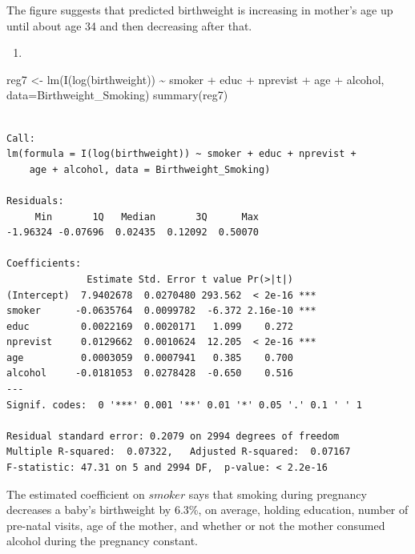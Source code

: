 \documentclass[
  letterpaper,
  DIV=11,
  numbers=noendperiod]{scrreprt}
\newenvironment{Shaded}{\begin{snugshade}}{\end{snugshade}}
\newcommand{\AttributeTok}[1]{\textcolor[rgb]{0.40,0.45,0.13}{#1}}
\newcommand{\FunctionTok}[1]{\textcolor[rgb]{0.28,0.35,0.67}{#1}}
\newcommand{\NormalTok}[1]{\textcolor[rgb]{0.00,0.23,0.31}{#1}}
\newcommand{\OtherTok}[1]{\textcolor[rgb]{0.00,0.23,0.31}{#1}}
\newcommand{\SpecialCharTok}[1]{\textcolor[rgb]{0.37,0.37,0.37}{#1}}
\providecommand{\tightlist}{%
  \setlength{\itemsep}{0pt}\setlength{\parskip}{0pt}}\usepackage{longtable,booktabs,array}
\begin{document}
The figure suggests that predicted birthweight is increasing in mother's
age up until about age 34 and then decreasing after that.

\begin{enumerate}
\def\labelenumi{\arabic{enumi}.}
\setcounter{enumi}{6}
\tightlist
\item
\end{enumerate}

\begin{Shaded}
\begin{Highlighting}[]
\NormalTok{reg7 }\OtherTok{\textless{}{-}} \FunctionTok{lm}\NormalTok{(}\FunctionTok{I}\NormalTok{(}\FunctionTok{log}\NormalTok{(birthweight)) }\SpecialCharTok{\textasciitilde{}}\NormalTok{ smoker }\SpecialCharTok{+}\NormalTok{ educ }\SpecialCharTok{+}\NormalTok{ nprevist }\SpecialCharTok{+}\NormalTok{ age }\SpecialCharTok{+}\NormalTok{ alcohol,}
           \AttributeTok{data=}\NormalTok{Birthweight\_Smoking)}
\FunctionTok{summary}\NormalTok{(reg7)}
\end{Highlighting}
\end{Shaded}

\begin{verbatim}

Call:
lm(formula = I(log(birthweight)) ~ smoker + educ + nprevist + 
    age + alcohol, data = Birthweight_Smoking)

Residuals:
     Min       1Q   Median       3Q      Max 
-1.96324 -0.07696  0.02435  0.12092  0.50070 

Coefficients:
              Estimate Std. Error t value Pr(>|t|)    
(Intercept)  7.9402678  0.0270480 293.562  < 2e-16 ***
smoker      -0.0635764  0.0099782  -6.372 2.16e-10 ***
educ         0.0022169  0.0020171   1.099    0.272    
nprevist     0.0129662  0.0010624  12.205  < 2e-16 ***
age          0.0003059  0.0007941   0.385    0.700    
alcohol     -0.0181053  0.0278428  -0.650    0.516    
---
Signif. codes:  0 '***' 0.001 '**' 0.01 '*' 0.05 '.' 0.1 ' ' 1

Residual standard error: 0.2079 on 2994 degrees of freedom
Multiple R-squared:  0.07322,   Adjusted R-squared:  0.07167 
F-statistic: 47.31 on 5 and 2994 DF,  p-value: < 2.2e-16
\end{verbatim}

The estimated coefficient on \(smoker\) says that smoking during
pregnancy decreases a baby's birthweight by 6.3\%, on average, holding
education, number of pre-natal visits, age of the mother, and whether or
not the mother consumed alcohol during the pregnancy constant.
\end{document}
